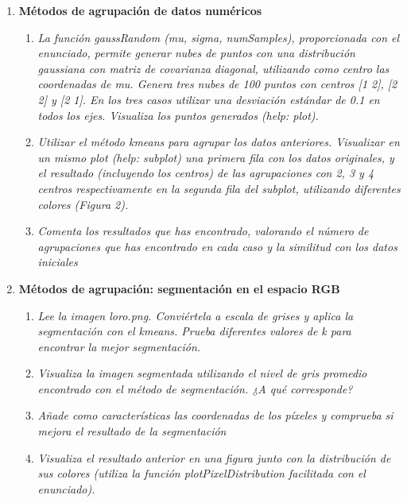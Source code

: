 \documentclass{article}
\begin{document}
\begin{enumerate}
\newpage

 \item \textbf{Métodos de agrupación de datos numéricos}

 \begin{enumerate}
 \item \textit{La función gaussRandom (mu, sigma, numSamples), proporcionada con el 
enunciado,  permite  generar  nubes  de  puntos  con  una  distribución 
gaussiana con matriz de covarianza diagonal, utilizando como centro las 
coordenadas de mu. Genera tres nubes de 100 puntos con centros [1 2], [2 
2]  y  [2  1].  En  los  tres  casos  utilizar  una desviación  estándar  de  0.1  en 
todos los ejes. Visualiza los puntos generados (help: plot).}

 \item \textit{Utilizar el método kmeans para agrupar los datos anteriores. Visualizar en 
un mismo plot (help: subplot) una primera fila con los datos originales, y 
el  resultado  (incluyendo  los  centros)  de  las  agrupaciones  con  2,  3  y  4 
centros  respectivamente  en  la  segunda  fila  del  subplot,  utilizando 
diferentes colores (Figura 2).}

 \item \textit{Comenta  los  resultados  que  has  encontrado,  valorando  el  número  de 
agrupaciones que has encontrado en cada caso y la similitud con los datos 
iniciales}
 
 \end{enumerate}

\newpage

 \item \textbf{Métodos de agrupación: segmentación en el espacio RGB}

 \begin{enumerate}
 \item \textit{Lee  la  imagen   loro.png.  Conviértela  a  escala  de  grises  y  aplica  la 
segmentación  con  el  kmeans.  Prueba  diferentes  valores  de  k para 
encontrar la mejor segmentación.}

 \item \textit{Visualiza  la  imagen  segmentada  utilizando  el  nivel  de  gris  promedio 
encontrado con el método de segmentación. ¿A qué corresponde?}

 \item \textit{Añade como características las coordenadas de los píxeles y comprueba si 
mejora el resultado de la segmentación}

  \item \textit{Visualiza el resultado anterior en una  figura junto con la distribución de 
sus  colores  (utiliza  la  función plotPixelDistribution facilitada  con  el 
enunciado).}
  

\end{enumerate}
\end{enumerate}
\end{document}
